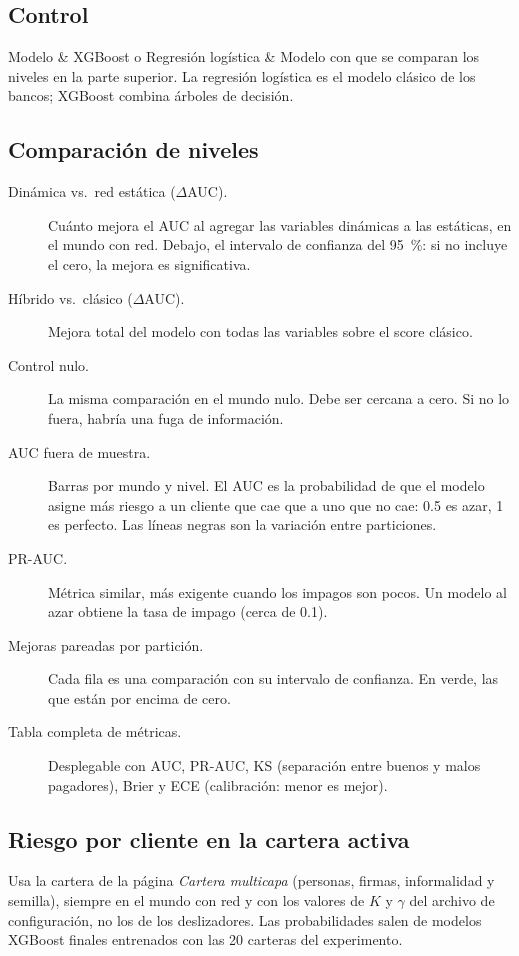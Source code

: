 \subsection*{Control}
\begin{controles}
Modelo & XGBoost o Regresión logística & Modelo con que se comparan los niveles en la
parte superior. La regresión logística es el modelo clásico de los bancos; XGBoost
combina árboles de decisión. \\
\end{controles}

\subsection*{Comparación de niveles}
\begin{description}
\item[Dinámica vs.\ red estática ($\Delta$AUC).] Cuánto mejora el AUC al agregar las
variables dinámicas a las estáticas, en el mundo con red. Debajo, el intervalo de
confianza del 95~\%: si no incluye el cero, la mejora es significativa.
\item[Híbrido vs.\ clásico ($\Delta$AUC).] Mejora total del modelo con todas las variables
sobre el score clásico.
\item[Control nulo.] La misma comparación en el mundo nulo. Debe ser cercana a cero. Si
no lo fuera, habría una fuga de información.
\item[AUC fuera de muestra.] Barras por mundo y nivel. El AUC es la probabilidad de que el
modelo asigne más riesgo a un cliente que cae que a uno que no cae: 0.5 es azar, 1 es
perfecto. Las líneas negras son la variación entre particiones.
\item[PR-AUC.] Métrica similar, más exigente cuando los impagos son pocos. Un modelo al
azar obtiene la tasa de impago (cerca de 0.1).
\item[Mejoras pareadas por partición.] Cada fila es una comparación con su intervalo de
confianza. En verde, las que están por encima de cero.
\item[Tabla completa de métricas.] Desplegable con AUC, PR-AUC, KS (separación entre
buenos y malos pagadores), Brier y ECE (calibración: menor es mejor).
\end{description}


\subsection*{Riesgo por cliente en la cartera activa}
Usa la cartera de la página \emph{Cartera multicapa} (personas, firmas, informalidad y
semilla), siempre en el mundo con red y con los valores de $K$ y $\gamma$ del archivo de
configuración, no los de los deslizadores. Las probabilidades salen de modelos XGBoost
finales entrenados con las 20 carteras del experimento.

